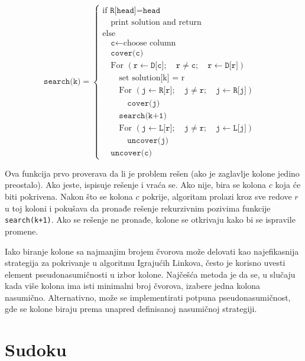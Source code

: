 \documentclass[a4paper]{article}
\begin{document}
{  \[
    \texttt{search(k)} =
    \begin{cases}
    \text{if } \texttt{R[head]} = \texttt{head} \\
    \quad \text{print solution and return} \\
    \text{else} \\
    \quad \texttt{c} \gets \text{choose column} \\
    \quad \texttt{cover(c)} \\
    \quad \text{For } (\texttt{r} \gets \texttt{D[c]}; \quad \texttt{r} \neq \texttt{c}; \quad \texttt{r} \gets \texttt{D[r]}) & \\
    \quad \quad \text{set solution[k] = r} \\
    \quad \quad \text{For } (\texttt{j} \gets \texttt{R[r]}; \quad \texttt{j} \neq \texttt{r}; \quad \texttt{j} \gets \texttt{R[j]}) & \\
    \quad \quad \quad \texttt{cover(j)} \\
    \quad \quad \texttt{search(k+1)} \\
    \quad \quad \text{For } (\texttt{j} \gets \texttt{L[r]}; \quad \texttt{j} \neq \texttt{r}; \quad \texttt{j} \gets \texttt{L[j]}) & \\
    \quad \quad \quad \texttt{uncover(j)} \\
    \quad \texttt{uncover(c)}
    \end{cases}
    \]

    Ova funkcija prvo proverava da li je problem rešen (ako je zaglavlje kolone jedino preostalo). Ako jeste, ispisuje rešenje i vraća se. Ako nije, bira se kolona \(c\) koja će biti pokrivena. Nakon što se kolona \(c\) pokrije, algoritam prolazi kroz sve redove \(r\) u toj koloni i pokušava da pronađe rešenje rekurzivnim pozivima funkcije \texttt{search(k+1)}. Ako se rešenje ne pronađe, kolone se otkrivaju kako bi se ispravile promene.

    Iako biranje kolone sa najmanjim brojem čvorova može delovati kao najefikasnija strategija za pokrivanje u algoritmu Igrajućih Linkova, često je korisno uvesti element pseudonasumičnosti u izbor kolone. Najčešća metoda je da se, u slučaju kada više kolona ima isti minimalni broj čvorova, izabere jedna kolona nasumično. Alternativno, može se implementirati potpuna pseudonasumičnost, gde se kolone biraju prema unapred definisanoj nasumičnoj strategiji.
\section{Sudoku}

}
\end{document}
